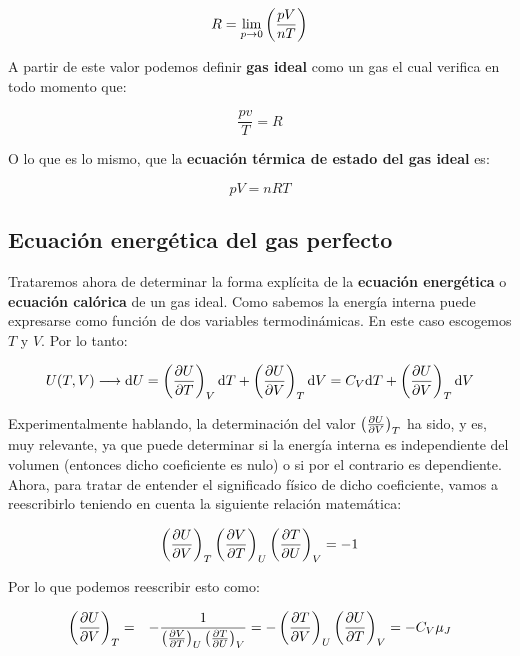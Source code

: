 \documentclass[12pt,a4paper]{article}
\begin{document}
\begin{equation}
R = \lim_{p \rightarrow 0} \left( \dfrac{p V}{n T} \right)
\end{equation}

A partir de este valor podemos definir \textbf{gas ideal} como un gas el cual verifica en todo momento que:

\begin{equation}
\dfrac{pv}{T} = R
\end{equation}

O lo que es lo mismo, que la \textbf{ecuación térmica de estado del gas ideal} es:

\begin{equation}
pV = nRT
\label{ec:1.1-006}
\end{equation}

\subsection{Ecuación energética del gas perfecto}

Trataremos ahora de determinar la forma explícita de la \textbf{ecuación energética} o \textbf{ecuación calórica} de un gas ideal. Como sabemos la energía interna puede expresarse como función de dos variables termodinámicas. En este caso escogemos $T$ y $V$. Por lo tanto:

\begin{equation}
U(T,V) \longrightarrow \mathrm{d} U = \left( \frac{\partial U}{\partial T} \right)_V \mathrm{d} T + \left( \frac{\partial U}{\partial V} \right)_T \mathrm{d} V = C_V \mathrm{d} T + \left( \frac{\partial U}{\partial V} \right)_T \mathrm{d} V
\label{ec:1.2-007}
\end{equation}

Experimentalmente hablando, la determinación del valor $\left( \frac{\partial U}{\partial V} \right)_T$ ha sido, y es, muy relevante, ya que puede determinar si la energía interna es independiente del volumen (entonces dicho coeficiente es nulo) o si por el contrario es dependiente. Ahora, para tratar de entender el significado físico de dicho coeficiente, vamos a reescribirlo teniendo en cuenta la siguiente relación matemática:

\begin{equation}
\left( \frac{\partial U}{\partial V} \right)_T \left( \frac{\partial V}{\partial T} \right)_U \left( \frac{\partial T}{\partial U} \right)_V = -1 
\end{equation}

Por lo que podemos reescribir esto como: 

\begin{eqnarray}
\left( \frac{\partial U}{\partial V} \right)_T & = & - \dfrac{1}{\left( \frac{\partial V}{\partial T} \right)_U \left( \frac{\partial T}{\partial U} \right)_V }  = - \left( \frac{\partial T}{\partial V} \right)_U \left( \frac{\partial U}{\partial T} \right)_V = -C_V \mu_J
\end{eqnarray}
\end{document}
